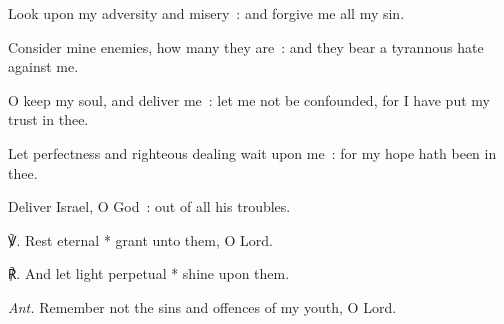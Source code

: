 Look upon my adversity and misery~: and forgive me all my sin.\par
{}Consider mine enemies, how many they are~: and they bear a tyrannous hate against me.\par
{}O keep my soul, and deliver me~: let me not be confounded, for I have put my trust in thee.\par
{}Let perfectness and righteous dealing wait upon me~: for my hope hath been in thee.\par
{}Deliver Israel, O God~: out of all his troubles.\par
℣. Rest eternal * grant unto them, O Lord.\par
℟. And let light perpetual * shine upon them.\par\noindent
\textit{Ant.} Remember not the sins and offences of my youth, O Lord.


